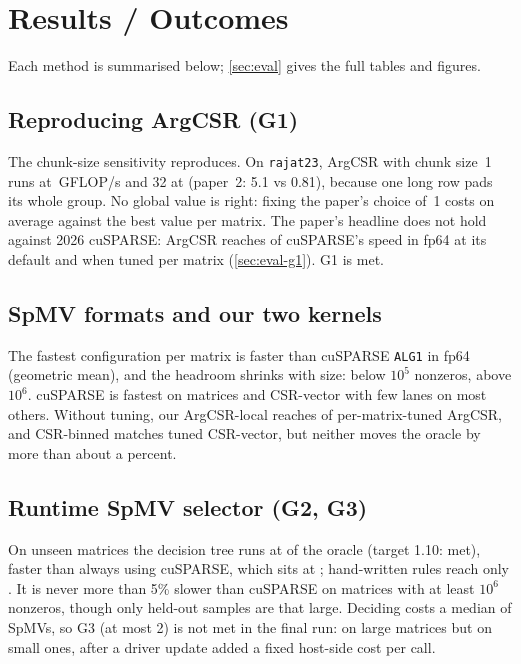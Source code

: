 \section{Results / Outcomes}\label{sec:results}

Each method is summarised below; \cref{sec:eval} gives the full tables and figures.

\subsection{Reproducing ArgCSR (G1)}\label{sec:res-g1}
The chunk-size sensitivity reproduces. On \texttt{rajat23}, ArgCSR with chunk size~1 runs at
\,GFLOP/s and 32 at  (paper~2: 5.1 vs 0.81), because one long row pads its
whole group. No global value is right: fixing the paper's choice of~1 costs \x{} on average against
the best value per matrix. The paper's headline does not hold against 2026 cuSPARSE: ArgCSR reaches
\x{} of cuSPARSE's speed in fp64 at its default and \x{} when
tuned per matrix (\cref{sec:eval-g1}). G1 is met.

\subsection{SpMV formats and our two kernels}\label{sec:res-formats}
The fastest configuration per matrix is \x{} faster than cuSPARSE \texttt{ALG1} in fp64
(geometric mean), and the headroom shrinks with size: \x{} below $10^5$ nonzeros,
\x{} above $10^6$. cuSPARSE is fastest on  matrices and CSR-vector
with few lanes on most others. Without tuning, our ArgCSR-local reaches  of per-matrix-tuned
ArgCSR, and CSR-binned matches tuned CSR-vector, but neither moves the oracle by more than about a percent.

\subsection{Runtime SpMV selector (G2, G3)}\label{sec:res-g2}
On  unseen matrices the decision tree runs at \x{} of the oracle (target
1.10: met), \x{} faster than always using cuSPARSE, which sits at \x;
hand-written rules reach only \x. It is never more than 5\% slower than cuSPARSE on matrices with at
least $10^6$ nonzeros, though only  held-out samples are that large. Deciding costs a median of
 SpMVs, so G3 (at most 2) is not met in the final run:  on large
matrices but  on small ones, after a driver update added a fixed host-side cost per call.

